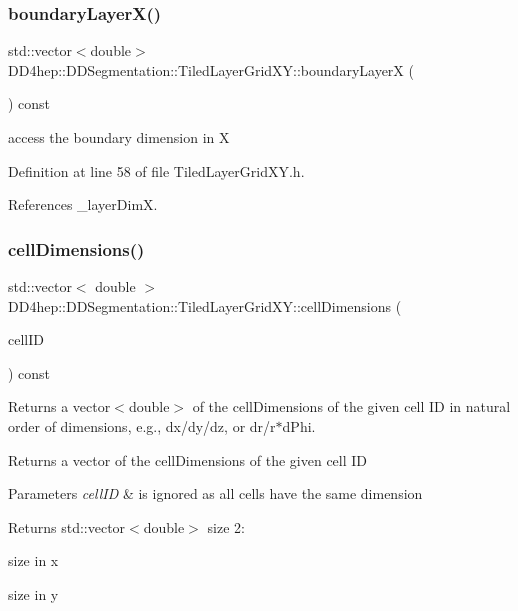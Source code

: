 \subsubsection{\texorpdfstring{boundary\+Layer\+X()}{boundaryLayerX()}}
{\footnotesize\ttfamily std\+::vector$<$double$>$ D\+D4hep\+::\+D\+D\+Segmentation\+::\+Tiled\+Layer\+Grid\+X\+Y\+::boundary\+LayerX (\begin{DoxyParamCaption}{ }\end{DoxyParamCaption}) const\hspace{0.3cm}{\ttfamily [inline]}}



access the boundary dimension in X 



Definition at line 58 of file Tiled\+Layer\+Grid\+X\+Y.\+h.



References \+\_\+layer\+DimX.

\hypertarget{class_d_d4hep_1_1_d_d_segmentation_1_1_tiled_layer_grid_x_y_af7a8796e14934f650b301f6ca0236a8d}{}\label{class_d_d4hep_1_1_d_d_segmentation_1_1_tiled_layer_grid_x_y_af7a8796e14934f650b301f6ca0236a8d} 
\subsubsection{\texorpdfstring{cell\+Dimensions()}{cellDimensions()}}
{\footnotesize\ttfamily std\+::vector$<$ double $>$ D\+D4hep\+::\+D\+D\+Segmentation\+::\+Tiled\+Layer\+Grid\+X\+Y\+::cell\+Dimensions (\begin{DoxyParamCaption}\item[{const \hyperlink{namespace_d_d4hep_1_1_d_d_segmentation_ac7af071d85cb48820914434a07e21ba1}{Cell\+ID} \&}]{cell\+ID }\end{DoxyParamCaption}) const\hspace{0.3cm}{\ttfamily [virtual]}}



Returns a vector$<$double$>$ of the cell\+Dimensions of the given cell ID in natural order of dimensions, e.\+g., dx/dy/dz, or dr/r$\ast$d\+Phi. 

Returns a vector of the cell\+Dimensions of the given cell ID 
\begin{DoxyParams}{Parameters}
{\em cell\+ID} & is ignored as all cells have the same dimension \\
\hline
\end{DoxyParams}
\begin{DoxyReturn}{Returns}
std\+::vector$<$double$>$ size 2\+:
\begin{DoxyEnumerate}
\item size in x
\item size in y 
\end{DoxyEnumerate}
\end{DoxyReturn}


